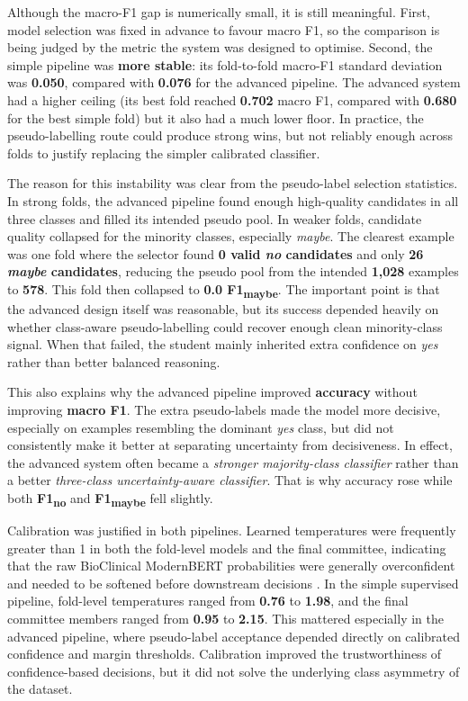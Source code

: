 \documentclass{article}
\begin{document}
Although the macro-F1 gap is numerically small, it is still meaningful. First, model selection was fixed in advance to favour macro F1, so the comparison is being judged by the metric the system was designed to optimise. Second, the simple pipeline was \textbf{more stable}: its fold-to-fold macro-F1 standard deviation was \textbf{0.050}, compared with \textbf{0.076} for the advanced pipeline. The advanced system had a higher ceiling (its best fold reached \textbf{0.702} macro F1, compared with \textbf{0.680} for the best simple fold) but it also had a much lower floor. In practice, the pseudo-labelling route could produce strong wins, but not reliably enough across folds to justify replacing the simpler calibrated classifier.

The reason for this instability was clear from the pseudo-label selection statistics. In strong folds, the advanced pipeline found enough high-quality candidates in all three classes and filled its intended pseudo pool. In weaker folds, candidate quality collapsed for the minority classes, especially \textit{maybe}. The clearest example was one fold where the selector found \textbf{0 valid \textit{no} candidates} and only \textbf{26 \textit{maybe} candidates}, reducing the pseudo pool from the intended \textbf{1,028} examples to \textbf{578}. This fold then collapsed to \textbf{0.0 F1\textsubscript{maybe}}. The important point is that the advanced design itself was reasonable, but its success depended heavily on whether class-aware pseudo-labelling could recover enough clean minority-class signal. When that failed, the student mainly inherited extra confidence on \textit{yes} rather than better balanced reasoning.

This also explains why the advanced pipeline improved \textbf{accuracy} without improving \textbf{macro F1}. The extra pseudo-labels made the model more decisive, especially on examples resembling the dominant \textit{yes} class, but did not consistently make it better at separating uncertainty from decisiveness. In effect, the advanced system often became a \textit{stronger majority-class classifier} rather than a better \textit{three-class uncertainty-aware classifier}. That is why accuracy rose while both \textbf{F1\textsubscript{no}} and \textbf{F1\textsubscript{maybe}} fell slightly.

Calibration was justified in both pipelines. Learned temperatures were frequently greater than 1 in both the fold-level models and the final committee, indicating that the raw BioClinical ModernBERT probabilities were generally overconfident and needed to be softened before downstream decisions \citep{Guo2017}. In the simple supervised pipeline, fold-level temperatures ranged from \textbf{0.76} to \textbf{1.98}, and the final committee members ranged from \textbf{0.95} to \textbf{2.15}. This mattered especially in the advanced pipeline, where pseudo-label acceptance depended directly on calibrated confidence and margin thresholds. Calibration improved the trustworthiness of confidence-based decisions, but it did not solve the underlying class asymmetry of the dataset.
\end{document}
